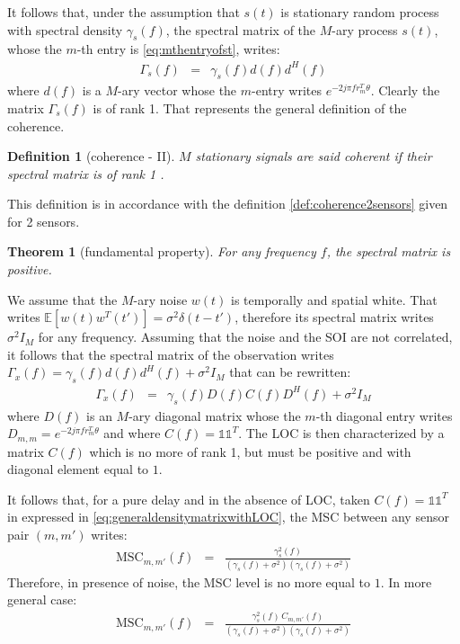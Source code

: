 \documentclass[a4paper, 12pt]{report}
\newcommand{\esp}[1]{\mathds{E}\left[ #1 \right]}
\newtheorem{theorem}{Theorem}
\newtheorem{definition}{Definition}
\def\MSC{\mathrm{MSC}}
\begin{document}
It follows  that, under the assumption  that $s(t)$ is stationary random process with spectral density $\gamma_{s}(f)$, the spectral matrix of the $M$-ary process $s(t)$, whose the $m$-th entry is \eqref{eq:mthentryofst}, writes:
\begin{eqnarray*}
\Gamma_{s}(f)&=&\gamma_{s}(f)d(f)d^{H}(f)
\end{eqnarray*}
where $d(f)$ is a $M$-ary vector whose the $m$-entry writes $e^{-2j\pi fr_{m}^{T}\theta}$. Clearly the matrix $\Gamma_{s}(f)$ is of rank 1.  That represents the general definition of the coherence. 
\begin{definition}[coherence - II]
\label{def:coherenceMsensors}
$M$ stationary signals are said coherent if their spectral matrix is of rank 1 . 
\end{definition}

This definition is in accordance with the definition \ref{def:coherence2sensors} given for 2 sensors. 

\begin{theorem}[fundamental property]
For any frequency $f$, the spectral matrix is positive.
\end{theorem}


We assume that the $M$-ary noise $w(t)$ is temporally and spatial white. That writes $\esp{w(t)w^{T}(t')}=\sigma^{2}\delta(t-t')$, therefore its spectral matrix writes $\sigma^{2}I_M$ for any frequency. Assuming that the noise and the SOI are not correlated, it follows that the spectral matrix of the observation writes $\Gamma_{x}(f)= \gamma_{s}(f)d(f)d^{H}(f) + \sigma^{2}I_M$ that can be rewritten:
\begin{eqnarray}
\label{eq:generaldensitymatrixwithLOC}
 \Gamma_{x}(f)&=& \gamma_{s}(f)D(f)C(f)D^{H}(f) + \sigma^{2}I_M
\end{eqnarray}
where $D(f)$ is an $M$-ary diagonal matrix whose the $m$-th diagonal entry writes $D_{m,m}=e^{-2j\pi f r_{m}^{T}\theta }$ and where $C(f)=\mathds{1}\mathds{1}^{T}$. The LOC is then characterized by a matrix $C(f)$ which is no more of rank 1,  but must be positive and with diagonal element equal to $1$. 

\medskip
It follows that, for a pure delay and in the absence of LOC, taken $C(f)=\mathds{1}\mathds{1}^{T}$ in expressed in \eqref{eq:generaldensitymatrixwithLOC}, the MSC between any  sensor pair $(m,m')$ writes:
\begin{eqnarray*}
 \MSC_{m,m'}(f)&=& \frac{\gamma_{s}^{2}(f)}{(\gamma_{s}(f)+\sigma^{2})(\gamma_{s}(f)+\sigma^{2})}
\end{eqnarray*}
Therefore, in presence of noise, the MSC level is no more equal to $1$. In more general case:
\begin{eqnarray*}
 \MSC_{m,m'}(f)&=& \frac{\gamma_{s}^{2}(f)\, C_{m,m'}(f)}{(\gamma_{s}(f)+\sigma^{2})(\gamma_{s}(f)+\sigma^{2})}
\end{eqnarray*}
\end{document}

